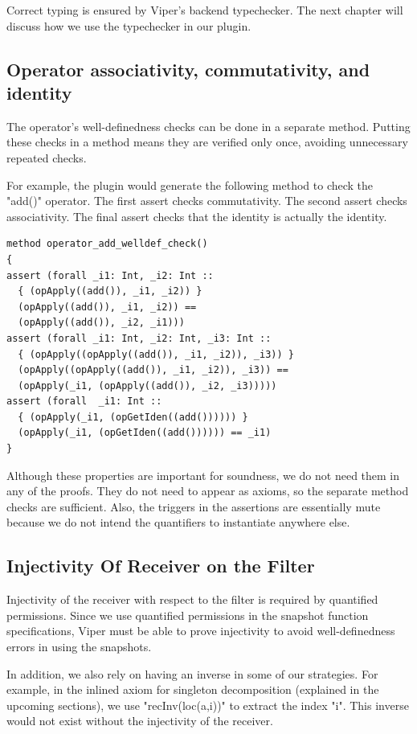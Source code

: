 \documentclass[msc,oneside]{ubcthesis}
\theoremstyle{definition}
\begin{document}
Correct typing is ensured by Viper's backend typechecker. The next chapter will discuss how we use the typechecker in our plugin. 

\subsection{Operator associativity, commutativity, and identity}
The operator's well-definedness checks can be done in a 
separate method. Putting these checks in a method means they are verified only once, avoiding unnecessary repeated checks.

For example, the plugin would generate the following method to check the "add()" operator. The first assert checks commutativity. The second assert checks associativity. The final assert checks that the identity is actually the identity. 
\begin{lstlisting}
method operator_add_welldef_check()
{
assert (forall _i1: Int, _i2: Int ::
  { (opApply((add()), _i1, _i2)) }
  (opApply((add()), _i1, _i2)) ==
  (opApply((add()), _i2, _i1)))
assert (forall _i1: Int, _i2: Int, _i3: Int ::
  { (opApply((opApply((add()), _i1, _i2)), _i3)) }
  (opApply((opApply((add()), _i1, _i2)), _i3)) ==
  (opApply(_i1, (opApply((add()), _i2, _i3)))))
assert (forall  _i1: Int ::
  { (opApply(_i1, (opGetIden((add()))))) }
  (opApply(_i1, (opGetIden((add()))))) == _i1)
}
\end{lstlisting}
Although these properties are important for soundness, we do not need them in any of the proofs. They do not need to appear as axioms, so the separate method checks are sufficient. Also, the triggers in the assertions are essentially mute because we do not intend the quantifiers to instantiate anywhere else. 

\subsection{Injectivity Of Receiver on the Filter}
Injectivity of the receiver with respect to the filter is required by quantified permissions. Since we use quantified permissions in the snapshot function specifications, Viper must be able to prove injectivity to avoid well-definedness errors in using the snapshots. 

In addition, we also rely on having an inverse in some of our strategies. For example, in the inlined axiom for singleton decomposition (explained in the upcoming sections), we use "recInv(loc(a,i))" to extract the index "i". This inverse would not exist without the injectivity of the receiver.
\end{document}
